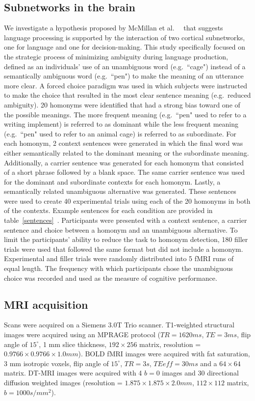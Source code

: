\documentclass[final,authoryear,5p,times,twocolumn]{elsarticle}
\begin{document}
\subsection{Subnetworks in the brain} 
We investigate a hypothesis proposed by McMillan et al.\ ~\citep{McMillan2010} that suggests language processing is supported by the interaction of two cortical subnetworks, one for language and one for decision-making. This study specifically focused on the strategic process of minimizing ambiguity during language production, defined as an individuals' use of an unambiguous word (e.g.\ ``cage") instead of a semantically ambiguous word (e.g.\ ``pen") to make the meaning of an utterance more clear. A forced choice paradigm was used in which subjects were instructed to make the choice that resulted in the most clear sentence meaning (e.g.\ reduced ambiguity). 20 homonyms were identified that had a strong bias toward one of the possible meanings. The more frequent meaning (e.g.\ ``pen" used to refer to a writing implement) is referred to as dominant while the less frequent meaning (e.g.\ ``pen" used to refer to an animal cage) is referred to as subordinate. For each homonym, 2 context sentences were generated in which the final word was either semantically related to the dominant meaning or the subordinate meaning. Additionally, a carrier sentence was generated for each homonym that consisted of a short phrase followed by a blank space. The same carrier sentence was used for the dominant and subordinate contexts for each homonym.  Lastly, a semantically related unambiguous alternative was generated. These sentences were used to create 40 experimental trials using each of the 20 homonyms in both of the contexts. Example sentences for each condition are provided in table~\ref{sentences}~\citep{McMillan2010}. Participants were presented with a context sentence, a carrier sentence and choice between a homonym and an unambiguous alternative. To limit the participants' ability to reduce the task to homonym detection, 180 filler trials were used that followed the same format but did not include a homonym. Experimental and filler trials were randomly distributed into 5 fMRI runs of equal length. The frequency with which participants chose the unambiguous choice was recorded and used as the measure of cognitive performance.

\subsection{MRI acquisition}
Scans were acquired on a Siemens 3.0T Trio scanner. T1-weighted structural images were acquired using an MPRAGE protocol ($TR = 1620 ms$, $TE = 3 ms$, flip angle of $15^{\circ}$, 1 mm slice thickness, $192 \times 256$ matrix, resolution = $0.9766 \times 0.9766 \times 1.0 mm$). BOLD fMRI images were acquired with fat saturation, 3 mm isotropic voxels, flip angle of $15^{\circ}$, $TR = 3 s$, $TEeff = 30 ms$ and a $64 \times 64$ matrix. DT-MRI images were acquired with 4 $b=0$ images and 30 directional diffusion weighted images (resolution = $1.875 \times 1.875 \times 2.0 mm$, $112 \times 112$ matrix, $b=1000 s/mm^2$). 
\end{document}
